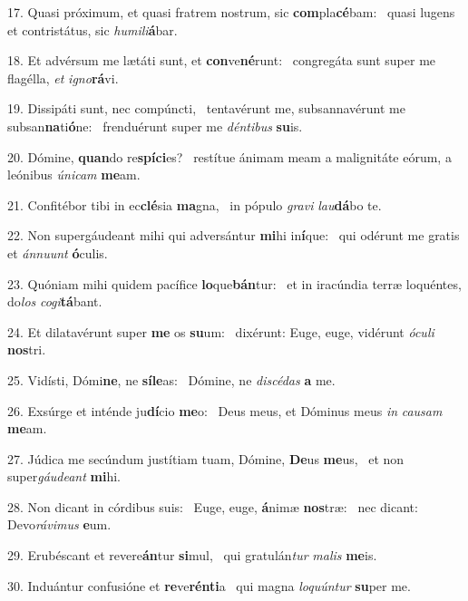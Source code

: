 17. Quasi próximum, et quasi fratrem nostrum, sic \textbf{com}pla\textbf{cé}bam: \ast\  quasi lugens et contristátus, sic \textit{hu}\textit{mi}\textit{li}\textbf{á}bar.\

18. Et advérsum me lætáti sunt, et \textbf{con}ve\textbf{né}runt: \ast\  congregáta sunt super me flagélla, \textit{et} \textit{i}\textit{gno}\textbf{rá}vi.\

19. Dissipáti sunt, nec compúncti, \dag\  tentavérunt me, subsannavérunt me subsan\textbf{na}ti\textbf{ó}ne: \ast\  frenduérunt super me \textit{dén}\textit{ti}\textit{bus} \textbf{su}is.\

20. Dómine, \textbf{quan}do re\textbf{spí}\textbf{ci}es? \ast\  restítue ánimam meam a malignitáte eórum, a leónibus \textit{ú}\textit{ni}\textit{cam} \textbf{me}am.\

21. Confitébor tibi in ec\textbf{clé}sia \textbf{ma}gna, \ast\  in pópulo \textit{gra}\textit{vi} \textit{lau}\textbf{dá}bo te.\

22. Non supergáudeant mihi qui adversántur \textbf{mi}hi in\textbf{í}que: \ast\  qui odérunt me gratis et \textit{án}\textit{nu}\textit{unt} \textbf{ó}culis.\

23. Quóniam mihi quidem pacífice \textbf{lo}que\textbf{bán}tur: \ast\  et in iracúndia terræ loquéntes, do\textit{los} \textit{co}\textit{gi}\textbf{tá}bant.\

24. Et dilatavérunt super \textbf{me} os \textbf{su}um: \ast\  dixérunt: Euge, euge, vidérunt \textit{ó}\textit{cu}\textit{li} \textbf{nos}tri.\

25. Vidísti, Dómi\textbf{ne}, ne \textbf{sí}\textbf{le}as: \ast\  Dómine, ne \textit{di}\textit{scé}\textit{das} \textbf{a} me.\

26. Exsúrge et inténde ju\textbf{dí}cio \textbf{me}o: \ast\  Deus meus, et Dóminus meus \textit{in} \textit{cau}\textit{sam} \textbf{me}am.\

27. Júdica me secúndum justítiam tuam, Dómine, \textbf{De}us \textbf{me}us, \ast\  et non super\textit{gáu}\textit{de}\textit{ant} \textbf{mi}hi.\

28. Non dicant in córdibus suis: \dag\  Euge, euge, \textbf{á}nimæ \textbf{nos}træ: \ast\  nec dicant: Devo\textit{rá}\textit{vi}\textit{mus} \textbf{e}um.\

29. Erubéscant et revere\textbf{án}tur \textbf{si}mul, \ast\  qui gratulán\textit{tur} \textit{ma}\textit{lis} \textbf{me}is.\

30. Induántur confusióne et \textbf{re}ve\textbf{rén}\textbf{ti}a \ast\  qui magna \textit{lo}\textit{quún}\textit{tur} \textbf{su}per me.\

